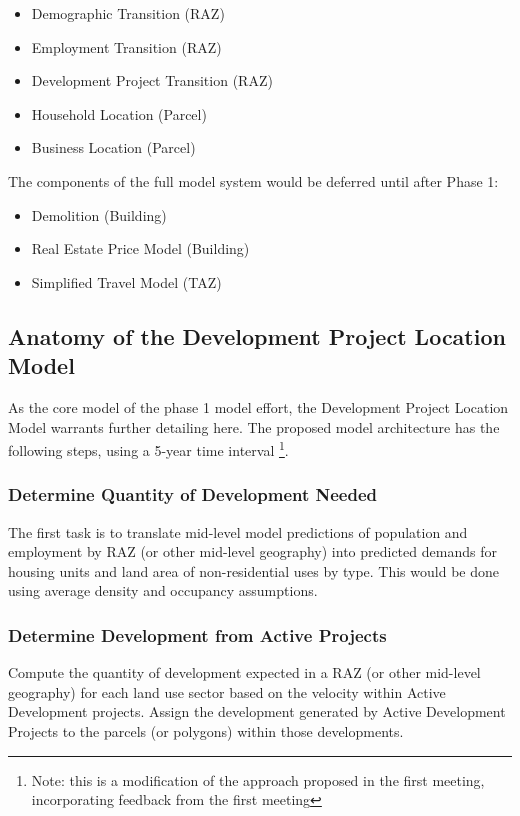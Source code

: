 \begin{itemize}
\item Demographic Transition (RAZ)
\item Employment Transition (RAZ)
\item Development Project Transition (RAZ)
\item Household Location (Parcel)
\item Business Location (Parcel)
\end{itemize}

The components of the full model system would be deferred until after Phase 1:

\begin{itemize}
\item Demolition (Building)
\item Real Estate Price Model (Building)
\item Simplified Travel Model (TAZ)
\end{itemize}


\subsection{Anatomy of the Development Project Location Model}
As the core model of the phase 1 model effort, the Development Project Location Model warrants
further detailing here.  The proposed model architecture has the following steps, using a 5-year time interval \footnote{Note: this is a modification of the approach proposed in the first meeting,
incorporating feedback from the first meeting}.

\subsubsection{Determine Quantity of Development Needed}

The first task is to translate mid-level model predictions of population and employment by RAZ (or
other mid-level geography) into predicted demands for housing units and land area of non-residential
uses by type. This would be done using average density and occupancy assumptions.

\subsubsection{Determine Development from Active Projects}

Compute the quantity of development expected in a RAZ (or other mid-level geography) for each land use
sector based on the velocity within Active Development projects. Assign the development generated
by Active Development Projects to the parcels (or polygons) within those developments.

